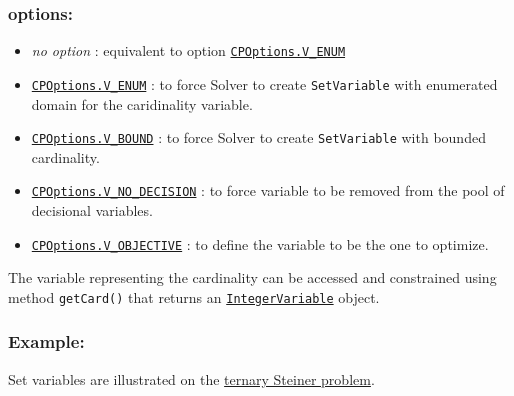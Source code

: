 \subsubsection{options:}
	\begin{itemize}
		\item \emph{no option} : equivalent to option \hyperlink{venum:venumoptions}{\tt CPOptions.V\_ENUM}
		\item \hyperlink{venum:venumoptions}{\tt CPOptions.V\_ENUM} : to force Solver to create \texttt{SetVariable} with enumerated domain for the caridinality variable.
		\item \hyperlink{vbound:vboundoptions}{\tt CPOptions.V\_BOUND} : to force Solver to create \texttt{SetVariable} with bounded cardinality.
		\item \hyperlink{vnodecision:vnodecisionoptions}{\tt CPOptions.V\_NO\_DECISION} : to force variable to be removed from the pool of decisional variables.
		\item \hyperlink{vobjective:vobjectiveoptions}{\tt CPOptions.V\_OBJECTIVE} : to define the variable to be the one to optimize.
	\end{itemize}

The variable representing the cardinality can be accessed and constrained using method \texttt{getCard()} that returns an \hyperlink{integervariable}{\tt IntegerVariable} object.

\subsubsection{Example:}


Set variables are illustrated on the \hyperlink{model:example2:ternarysteinerchoco}{ternary Steiner problem}. 


